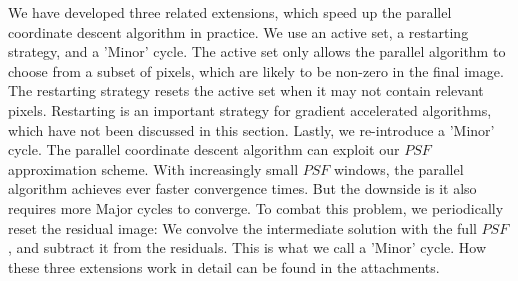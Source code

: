 We have developed three related extensions, which speed up the parallel coordinate descent algorithm in practice. We use an active set, a restarting strategy, and a 'Minor' cycle. The active set only allows the parallel algorithm to choose from a subset of pixels, which are likely to be non-zero in the final image. The restarting strategy resets the active set when it may not contain relevant pixels. Restarting is an important strategy for gradient accelerated algorithms, which have not been discussed in this section. Lastly, we re-introduce a 'Minor' cycle. The parallel coordinate descent algorithm can exploit our $PSF$ approximation scheme. With increasingly small $PSF$ windows, the parallel algorithm achieves ever faster convergence times. But the downside is it also requires more Major cycles to converge. To combat this problem, we periodically reset the residual image: We convolve the intermediate solution with the full $PSF$, and subtract it from the residuals. This is what we call a 'Minor' cycle. How these three extensions work in detail can be found in the attachments.




